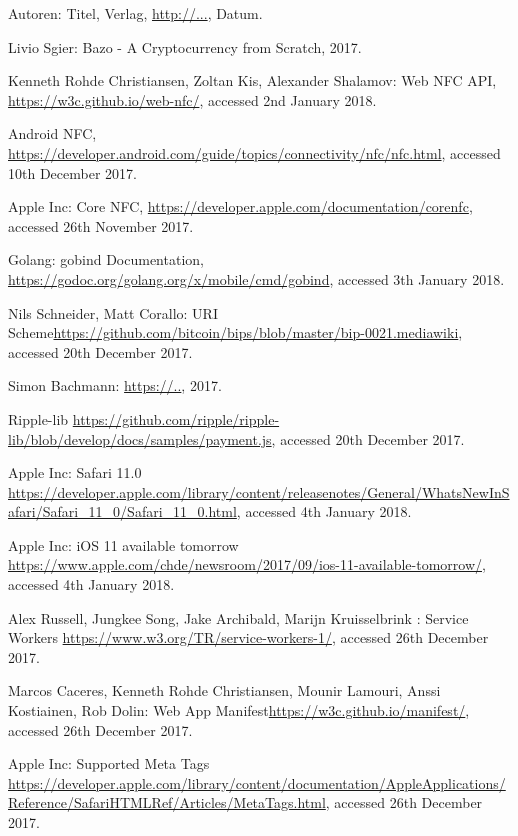\begin{thebibliography}{99}

 Autoren: Titel, Verlag, \url{http://...}, Datum.

 Livio Sgier: Bazo - A Cryptocurrency from Scratch, 2017.

 Kenneth Rohde Christiansen, Zoltan Kis, Alexander Shalamov: Web NFC API, \url{https://w3c.github.io/web-nfc/}, accessed 2nd January 2018.


 Android NFC, \url{https://developer.android.com/guide/topics/connectivity/nfc/nfc.html}, accessed 10th December 2017.

 Apple Inc: Core NFC, \url{https://developer.apple.com/documentation/corenfc}, accessed 26th November 2017.

 Golang: gobind Documentation, \url{https://godoc.org/golang.org/x/mobile/cmd/gobind}, accessed 3th January 2018.

 Nils Schneider, Matt Corallo: URI Scheme\url{https://github.com/bitcoin/bips/blob/master/bip-0021.mediawiki}, accessed 20th December 2017.

 Simon Bachmann:  \url{https://..}, 2017.

 Ripple-lib  \url{https://github.com/ripple/ripple-lib/blob/develop/docs/samples/payment.js}, accessed 20th December 2017.

 Apple Inc: Safari 11.0  \url{https://developer.apple.com/library/content/releasenotes/General/WhatsNewInSafari/Safari_11_0/Safari_11_0.html}, accessed 4th January 2018.

 Apple Inc: iOS 11 available tomorrow \url{https://www.apple.com/chde/newsroom/2017/09/ios-11-available-tomorrow/}, accessed 4th January 2018.

 Alex Russell, Jungkee Song, Jake Archibald, Marijn Kruisselbrink : Service Workers \url{https://www.w3.org/TR/service-workers-1/}, accessed 26th December 2017.

 Marcos Caceres, 
Kenneth Rohde Christiansen, Mounir Lamouri, Anssi Kostiainen, Rob Dolin: Web App Manifest\url{https://w3c.github.io/manifest/}, accessed 26th December 2017.

 Apple Inc: Supported Meta Tags \url{https://developer.apple.com/library/content/documentation/AppleApplications/Reference/SafariHTMLRef/Articles/MetaTags.html}, accessed 26th December 2017.


\end{thebibliography}
